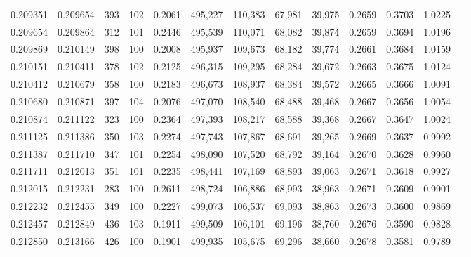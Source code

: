 \begin{tabular}{rrrrrrrrrrrrr}
0.209351 & 0.209654 &   393 & 102 &                                     0.2061 & 495,227 & 110,383 &  67,981 &  39,975 & 0.2659 & 0.3703 & 1.0225 \\
0.209654 & 0.209864 &   312 & 101 &                                     0.2446 & 495,539 & 110,071 &  68,082 &  39,874 & 0.2659 & 0.3694 & 1.0196 \\
0.209869 & 0.210149 &   398 & 100 &                                     0.2008 & 495,937 & 109,673 &  68,182 &  39,774 & 0.2661 & 0.3684 & 1.0159 \\
0.210151 & 0.210411 &   378 & 102 &                                     0.2125 & 496,315 & 109,295 &  68,284 &  39,672 & 0.2663 & 0.3675 & 1.0124 \\
0.210412 & 0.210679 &   358 & 100 &                                     0.2183 & 496,673 & 108,937 &  68,384 &  39,572 & 0.2665 & 0.3666 & 1.0091 \\
0.210680 & 0.210871 &   397 & 104 &                                     0.2076 & 497,070 & 108,540 &  68,488 &  39,468 & 0.2667 & 0.3656 & 1.0054 \\
0.210874 & 0.211122 &   323 & 100 &                                     0.2364 & 497,393 & 108,217 &  68,588 &  39,368 & 0.2667 & 0.3647 & 1.0024 \\
0.211125 & 0.211386 &   350 & 103 &                                     0.2274 & 497,743 & 107,867 &  68,691 &  39,265 & 0.2669 & 0.3637 & 0.9992 \\
0.211387 & 0.211710 &   347 & 101 &                                     0.2254 & 498,090 & 107,520 &  68,792 &  39,164 & 0.2670 & 0.3628 & 0.9960 \\
0.211711 & 0.212013 &   351 & 101 &                                     0.2235 & 498,441 & 107,169 &  68,893 &  39,063 & 0.2671 & 0.3618 & 0.9927 \\
0.212015 & 0.212231 &   283 & 100 &                                     0.2611 & 498,724 & 106,886 &  68,993 &  38,963 & 0.2671 & 0.3609 & 0.9901 \\
0.212232 & 0.212455 &   349 & 100 &                                     0.2227 & 499,073 & 106,537 &  69,093 &  38,863 & 0.2673 & 0.3600 & 0.9869 \\
0.212457 & 0.212849 &   436 & 103 &                                     0.1911 & 499,509 & 106,101 &  69,196 &  38,760 & 0.2676 & 0.3590 & 0.9828 \\
0.212850 & 0.213166 &   426 & 100 &                                     0.1901 & 499,935 & 105,675 &  69,296 &  38,660 & 0.2678 & 0.3581 & 0.9789 \\

\end{tabular}
